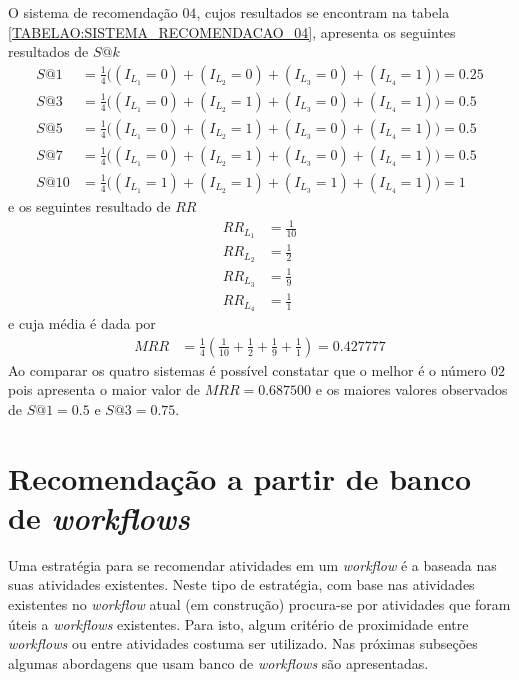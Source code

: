 O sistema de recomendação \(04\), cujos resultados se encontram na tabela \ref{TABELAO:SISTEMA_RECOMENDACAO_04}, apresenta os seguintes resultados de \(S@k\)
\begin{align}
S@1 &= \frac{1}{4}  \Big( (I_{L_{1}} = 0) + (I_{L_{2}} = 0) + (I_{L_{3}} = 0) + (I_{L_{4}} = 1) \Big)  =	0.25 \\
S@3 &= \frac{1}{4}  \Big( (I_{L_{1}} = 0) + (I_{L_{2}} = 1) + (I_{L_{3}} = 0) + (I_{L_{4}} = 1) \Big)	 =	0.5	 \\
S@5 &= \frac{1}{4}  \Big( (I_{L_{1}} = 0) + (I_{L_{2}} = 1) + (I_{L_{3}} = 0) + (I_{L_{4}} = 1) \Big)	 =	0.5	 \\
S@7 &= \frac{1}{4}  \Big( (I_{L_{1}} = 0) + (I_{L_{2}} = 1) + (I_{L_{3}} = 0) + (I_{L_{4}} = 1) \Big)	 =	0.5	 \\
S@10 &= \frac{1}{4} \Big( (I_{L_{1}} = 1) + (I_{L_{2}} = 1) + (I_{L_{3}} = 1) + (I_{L_{4}} = 1) \Big) =	1		
\end{align}
e os seguintes resultado de \(RR\)
\begin{align}
RR_{L_{1}} &= \frac{1}{10}		\\
RR_{L_{2}} &= \frac{1}{2}		\\
RR_{L_{3}} &= \frac{1}{9}		\\
RR_{L_{4}} &= \frac{1}{1}		
\end{align}
e cuja média é dada por 
\begin{align}
MRR &= \frac{1}{4} \left( \frac{1}{10} + \frac{1}{2} + \frac{1}{9} + \frac{1}{1} \right) = 0.427777
\end{align}
Ao comparar os quatro sistemas é possível constatar que o melhor é o número \(02\) pois apresenta o maior valor de \(MRR = 0.687500\) e os maiores valores observados de \(S@1 = 0.5\) e \(S@3 = 0.75\).

\section{Recomendação a partir de banco de \emph{workflows}}\label{SEC_RECOMENDACAO_BASE_WORKFLOWS}
Uma estratégia para se recomendar atividades em um \emph{workflow} é a baseada nas suas atividades existentes. Neste tipo de estratégia, com base nas atividades existentes no \emph{workflow} atual (em construção) procura-se por atividades que foram úteis a \emph{workflows} existentes. Para isto, algum critério de proximidade entre \emph{workflows} ou entre atividades costuma ser utilizado. Nas próximas subseções algumas abordagens que usam banco de \emph{workflows} são apresentadas.

